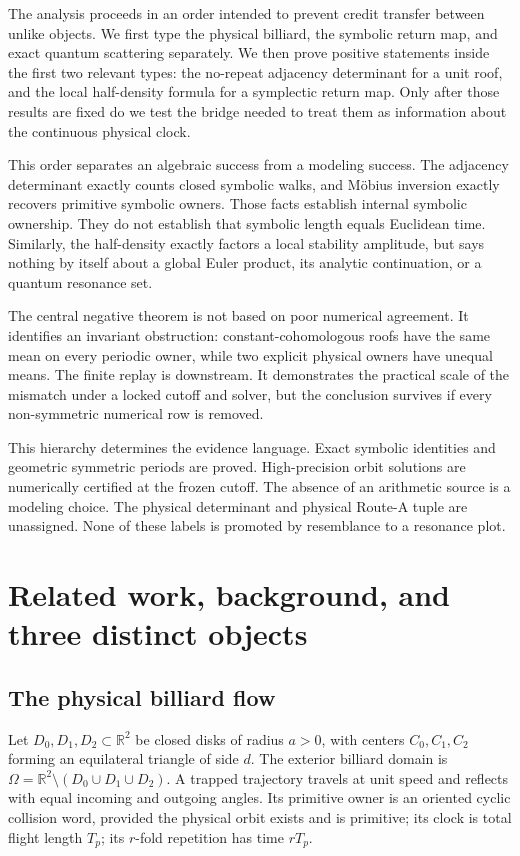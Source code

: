 \documentclass[11pt,a4paper]{article}
\theoremstyle{definition}
\theoremstyle{remark}
\begin{document}
The analysis proceeds in an order intended to prevent credit transfer between unlike objects. We first type the physical billiard, the symbolic return map, and exact quantum scattering separately. We then prove positive statements inside the first two relevant types: the no-repeat adjacency determinant for a unit roof, and the local half-density formula for a symplectic return map. Only after those results are fixed do we test the bridge needed to treat them as information about the continuous physical clock.

This order separates an algebraic success from a modeling success. The adjacency determinant exactly counts closed symbolic walks, and Möbius inversion exactly recovers primitive symbolic owners. Those facts establish internal symbolic ownership. They do not establish that symbolic length equals Euclidean time. Similarly, the half-density exactly factors a local stability amplitude, but says nothing by itself about a global Euler product, its analytic continuation, or a quantum resonance set.

The central negative theorem is not based on poor numerical agreement. It identifies an invariant obstruction: constant-cohomologous roofs have the same mean on every periodic owner, while two explicit physical owners have unequal means. The finite replay is downstream. It demonstrates the practical scale of the mismatch under a locked cutoff and solver, but the conclusion survives if every non-symmetric numerical row is removed.

This hierarchy determines the evidence language. Exact symbolic identities and geometric symmetric periods are proved. High-precision orbit solutions are numerically certified at the frozen cutoff. The absence of an arithmetic source is a modeling choice. The physical determinant and physical Route-A tuple are unassigned. None of these labels is promoted by resemblance to a resonance plot.

\section{Related work, background, and three distinct objects}

\subsection{The physical billiard flow}

Let \(D_0,D_1,D_2\subset\mathbb R^2\) be closed disks of radius \(a>0\), with centers \(C_0,C_1,C_2\) forming an equilateral triangle of side \(d\). The exterior billiard domain is
\(\Omega=\mathbb R^2\setminus(D_0\cup D_1\cup D_2)\). A trapped trajectory travels at unit speed and reflects with equal incoming and outgoing angles. Its primitive owner is an oriented cyclic collision word, provided the physical orbit exists and is primitive; its clock is total flight length \(T_p\); its \(r\)-fold repetition has time \(rT_p\).
\end{document}
